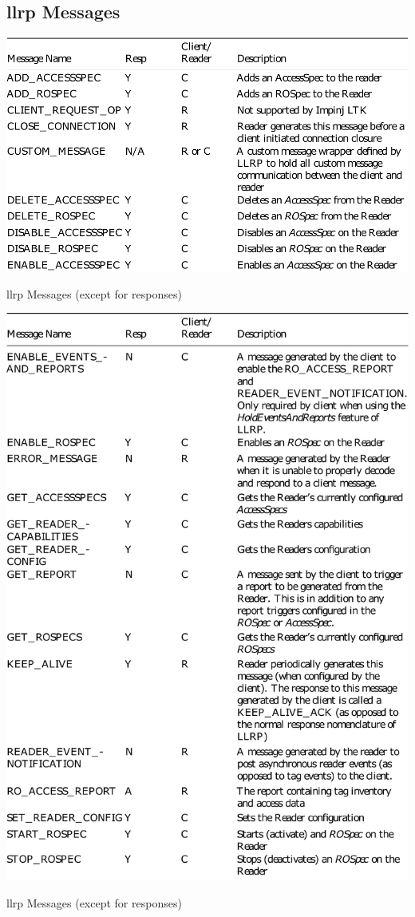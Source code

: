 \begin{appendices}
\section{\ac{llrp} Messages} \label{anx:llrpmessages}
\begin{table}
    \centering
    \includegraphics[width=\textwidth]{./figs/02-state-of-the-art/table_llrpmessages_1.pdf}
    \caption{\ac{llrp} Messages (except for responses)~\cite{ImpinjLTKProgrammers}} 
    \label{tab:llrpmessages1}
\end{table}

\begin{table}
    \centering
    \includegraphics[width=\textwidth]{./figs/02-state-of-the-art/table_llrpmessages_2.pdf}
    \caption{\ac{llrp} Messages (except for responses)~\cite{ImpinjLTKProgrammers}} 
    \label{tab:llrpmessages2}
\end{table}

\end{appendices}
